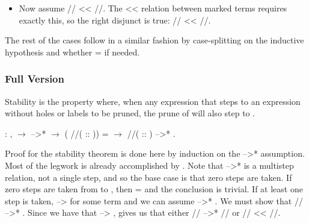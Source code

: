 \documentclass[12pt]{report}
\begin{document}
\begin{itemize}
\begin{itemize}
\item  Now assume // << //. The << relation between
    marked terms requires exactly this, so the right disjunct is
    true:   // <<   //.

\end{itemize}

\end{itemize}


The rest of the cases follow in a similar fashion by case-splitting
on the inductive hypothesis and whether  =  if needed.




\subsubsection{Full Version}



 Stability is the property where, when any expression  that
steps to an expression  without holes or labels to be pruned, the
prune of  will also step to . \begin{coqdoccode}
\coqdocemptyline
\coqdocindent{1.00em}
  : \coqdockw{\ensuremath{\forall}}   ,\coqdoceol
\coqdocindent{2.00em}
  \ensuremath{\rightarrow}\coqdoceol
\coqdocindent{2.00em}
 -->*  \ensuremath{\rightarrow}\coqdoceol
\coqdocindent{2.00em}
(  //\coqdocvar{\_}( :: )) =  \ensuremath{\rightarrow}\coqdoceol
\coqdocindent{2.00em}
  //\coqdocvar{\_}( :: ) -->* .\coqdoceol
\coqdocemptyline
\end{coqdoccode}
Proof for the stability theorem is done here by induction on the
     -->*  assumption. Most of the legwork is already
    accomplished by . Note that  -->*  is
    a multistep relation, not a single step, and so the base case is
    that zero steps are taken. If zero steps are taken from  to
    , then  =  and the conclusion is trivial. If at least one
    step is taken,  -->  for some term  and we can assume          -->* . We must show that // -->* .  Since we have that     --> ,  gives us that either                // -->* // or // << //.
\end{document}
